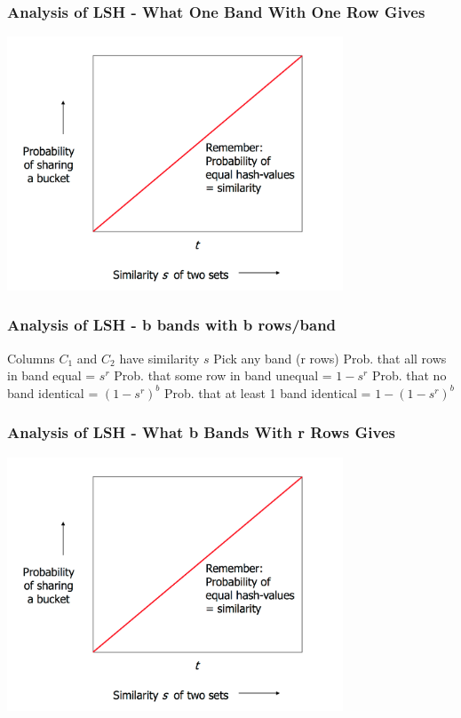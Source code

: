 \documentclass[svgnames]{beamer}
\begin{document}
  
\begin{frame} \frametitle{Analysis of LSH - What One Band With One Row Gives}

\includegraphics[width=10cm]{what-1-band-gives}

\end{frame}

  
\begin{frame} \frametitle{Analysis of LSH - b bands with b rows/band}

Columns $C_1$ and $C_2$ have similarity $s$
Pick any band (r rows)
  Prob. that all rows in band equal = $s^r$
  Prob. that some row in band unequal = $1 - s^r$
  Prob. that no band identical = $(1 - s^r)^b$
  Prob. that at least 1 band identical = $1 - (1 - s^r)^b$  
\end{frame}

  
\begin{frame} \frametitle{Analysis of LSH - What b Bands With r Rows Gives}

\includegraphics[width=10cm]{what-1-band-gives}

\end{frame}
\end{document}
